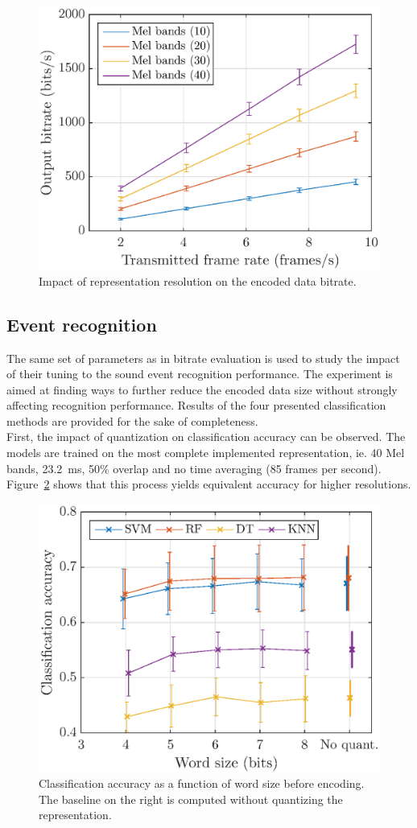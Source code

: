 \documentclass[12pt,times,onecolumn]{article}
\begin{document}
\begin{figure}[htbp]
	\centering
		\includegraphics[width=0.7\columnwidth]{figures/bitrate_mel_avg.eps}
	\caption{Impact of representation resolution on the encoded data bitrate.}
	\label{fig:bitrate_mel_avg}
\end{figure}


\subsection{Event recognition}

The same set of parameters as in bitrate evaluation is used to study the impact of their tuning to the sound event recognition performance. The experiment is aimed at finding ways to further reduce the encoded data size without strongly affecting recognition performance. Results of the four presented classification methods are provided for the sake of completeness.\\

First, the impact of quantization on classification accuracy can be observed. The models are trained on the most complete implemented representation, ie. 40 Mel bands, 23.2~ms, 50\% overlap and no time averaging (85 frames per second). Figure~\ref{fig:class_mel_q} shows that this process yields equivalent accuracy for higher resolutions.\\

\begin{figure}[htbp]
	\centering
		\includegraphics[width=0.7\columnwidth]{figures/class_mel_q.eps}
	\caption{Classification accuracy as a function of word size before encoding. The baseline on the right is computed without quantizing the representation.}
	\label{fig:class_mel_q}
\end{figure}
\end{document}
